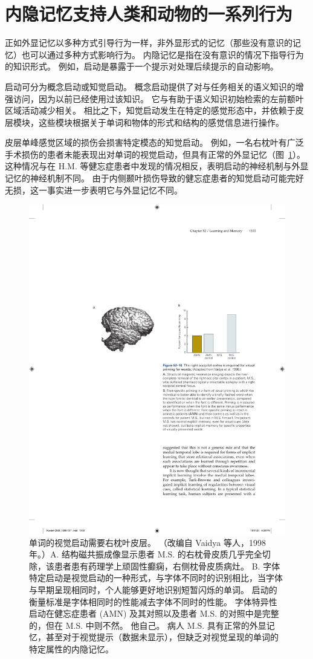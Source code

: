 \section{内隐记忆支持人类和动物的一系列行为}

正如外显记忆以多种方式引导行为一样，非外显形式的记忆（那些没有意识的记忆）也可以通过多种方式影响行为。
内隐记忆是指在没有意识的情况下指导行为的知识形式。
例如，启动是暴露于一个提示对处理后续提示的自动影响。


启动可分为概念启动或知觉启动。
概念启动提供了对与任务相关的语义知识的增强访问，因为以前已经使用过该知识。
它与有助于语义知识初始检索的左前额叶区域活动减少相关。
相比之下，知觉启动发生在特定的感觉形态中，并依赖于皮层模块，这些模块根据关于单词和物体的形式和结构的感觉信息进行操作。


皮层单峰感觉区域的损伤会损害特定模态的知觉启动。
例如，一名右枕叶有广泛手术损伤的患者未能表现出对单词的视觉启动，但具有正常的外显记忆（图~\ref{fig:52_10}）。
这种情况与在 H.M. 等健忘症患者中发现的情况相反，表明启动的神经机制与外显记忆的神经机制不同。
由于内侧颞叶损伤导致的健忘症患者的知觉启动可能完好无损，这一事实进一步表明它与外显记忆不同。


\begin{figure}[htbp]
	\centering
	\includegraphics[width=0.45\linewidth]{chap52/fig_52_10}
	\caption{单词的视觉启动需要右枕叶皮层。 （改编自 Vaidya 等人，1998 年。）A. 结构磁共振成像显示患者 M.S. 的右枕骨皮质几乎完全切除，该患者患有药理学上顽固性癫痫，右侧枕骨皮质病灶。 B. 字体特定启动是视觉启动的一种形式，与字体不同时的识别相比，当字体与早期呈现相同时，个人能够更好地识别短暂闪烁的单词。 启动的衡量标准是字体相同时的性能减去字体不同时的性能。 字体特异性启动在健忘症患者 (AMN) 及其对照以及患者 M.S. 的对照中是完整的，但在 M.S. 中则不然。 他自己。 病人 M.S. 具有正常的外显记忆，甚至对于视觉提示（数据未显示），但缺乏对视觉呈现的单词的特定属性的内隐记忆。}
	\label{fig:52_10}
\end{figure}



